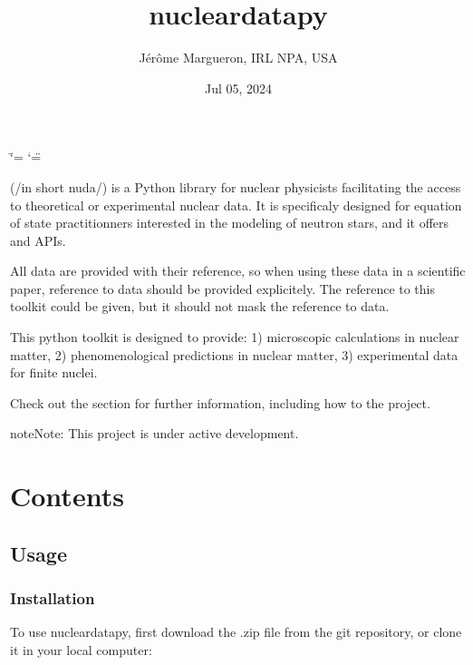 \documentclass[letterpaper,10pt,english]{sphinxmanual}
\title{nucleardatapy}
\date{Jul 05, 2024}
\author{Jérôme Margueron, IRL NPA, USA}
\begin{document}
\ifdefined\shorthandoff
  \ifnum\catcode`\=\string=\active\shorthandoff{=}\fi
  \ifnum\catcode`\"=\active{}\fi
\fi

\pagestyle{empty}
\sphinxmaketitle
\pagestyle{plain}
\sphinxtableofcontents
\pagestyle{normal}
\label{\detokenize{index::doc}}


\sphinxAtStartPar
{} (/in short nuda/) is a Python library for nuclear physicists facilitating the access to theoretical or experimental nuclear data. It is specificaly designed for equation of state practitionners interested in the modeling of neutron stars, and it offers  and  APIs.

\sphinxAtStartPar
All data are provided with their reference, so when using these data in a scientific paper, reference to data should be provided explicitely. The reference to this toolkit could be given, but it should not mask the reference to data.

\sphinxAtStartPar
This python toolkit is designed to provide:
1) microscopic calculations in nuclear matter,
2) phenomenological predictions in nuclear matter,
3) experimental data for finite nuclei.

\sphinxAtStartPar
Check out the {\hyperref[\detokenize{source/usage::doc}]{}} section for further information, including how to
{\hyperref[\detokenize{source/usage:installation}]{}} the project.

\begin{sphinxadmonition}{note}{Note:}
\sphinxAtStartPar
This project is under active development.
\end{sphinxadmonition}


\chapter{Contents}
\label{\detokenize{index:contents}}
\sphinxstepscope


\section{Usage}
\label{\detokenize{source/usage:usage}}\label{\detokenize{source/usage::doc}}

\subsection{Installation}
\label{\detokenize{source/usage:installation}}\label{\detokenize{source/usage:id1}}
\sphinxAtStartPar
To use nucleardatapy, first download the .zip file from the git repository, or clone it in your local computer:
\end{document}

